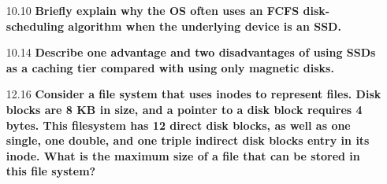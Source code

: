 \documentclass[11pt, letterpaper]{hw}
\begin{document}
\begin{enumerate}
\item [10.10] \textbf{Briefly explain why the OS often uses an FCFS disk-scheduling algorithm when the underlying device is an SSD.}

\item [10.14] \textbf{Describe one advantage and two disadvantages of using SSDs as a caching tier compared with using only magnetic disks.}
 
\item [12.16] \textbf{Consider a file system that uses inodes to represent files. Disk blocks are 8 KB in size, and a pointer to a disk block requires 4 bytes. This filesystem has 12 direct disk blocks, as well as one single, one double, and one triple indirect disk blocks entry in its inode. What is the maximum size of a file that can be stored in this file system?}
\end{enumerate}
\end{document}
